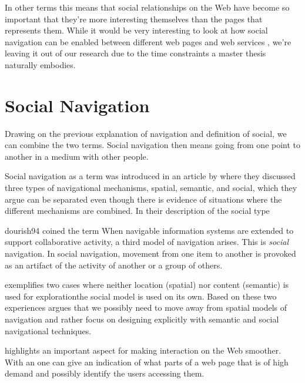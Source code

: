 In other terms this means that social relationships on the Web have become so
important that they're more interesting themselves than the pages that
represents them. While it would be very interesting to look at how social
navigation can be enabled between different web pages and web services%
,
we're leaving it out of our research due to the time constraints a master
thesis naturally embodies.

\section{Social Navigation}
\label{section:background.social.navigation}
Drawing on the previous explanation of navigation and definition of social, we
can combine the two terms. Social navigation then means going from one point
to another in a medium with other people.

Social navigation as a term was introduced in an article by
\citet{dourish94} where they discussed three types of navigational mechanisms,
spatial, semantic, and social, which they argue can be separated even though
there is evidence of situations where the different mechanisms are combined.
In their description of the social type
\begin{fullquote}[\p{1}]{dourish94}{%
  coined the term }
    When navigable information systems are extended to support collaborative
    activity, a third model of navigation arises. This is \emph{social}
    navigation. In social navigation, movement from one item to another is
    provoked as an artifact of the activity of another or a group of others.
\end{fullquote}

\citeauthor{dourish94} exemplifies two cases where neither location
(spatial) nor content (semantic) is used for exploration\dash{}the social
model is used on its own. Based on these two experiences
\citeauthor{dourish94} argues that we possibly need to move away from spatial
models of navigation and rather focus on designing explicitly with semantic
and social navigational techniques.

\citeauthor{dieberger97} highlights an important aspect for making interaction
on the Web smoother. With an
one can give an indication of what parts of a web page that is of high demand
and possibly identify the users accessing them.

